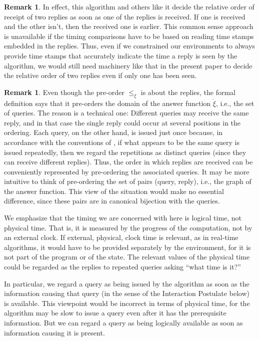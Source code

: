 \documentclass{LMCS}
\theoremstyle{definition}
\newtheorem{rmk}[thm]{Remark}
\newcommand{\ans}{\dot}
\begin{document}
\begin{rmk}
In effect, this algorithm and others like it decide the relative order
of receipt of two replies as soon as one of the replies is received.
If one is received and the other isn't, then the received one is
earlier.  This common sense approach is unavailable if the timing
comparisons have to be based on reading time stamps embedded in the
replies.  Thus, even if we constrained our environments to always
provide time stamps that accurately indicate the time a reply is seen
by the algorithm, we would still need machinery like that in the
present paper to decide the relative order of two replies even if only
one has been seen.
\end{rmk}

\begin{rmk}
  Even though the pre-order $\leq_\xi$ is about the replies, the
  formal definition says that it pre-orders the domain of the answer
  function ${\ans\xi}$, i.e., the set of queries.  The reason is a
  technical one: Different queries may receive the same reply, and in
  that case the single reply could occur at several positions in the
  ordering.  Each query, on the other hand, is issued just once
  because, in accordance with the conventions of \cite{oa1}, if what
  appears to be the same query is issued repeatedly, then we regard
  the repetitions as distinct queries (since they can receive
  different replies).  Thus, the order in which replies are received
  can be conveniently represented by pre-ordering the associated
  queries.  It may be more intuitive to think of pre-ordering the set
  of pairs (query, reply), i.e., the graph of the answer
  function. This view of the situation would make no essential
  difference, since these pairs are in canonical bijection with the
  queries.
\end{rmk}

We emphasize that the timing we are concerned with here is logical
time, not physical time.  That is, it is measured by the progress of
the computation, not by an external clock.  If external, physical,
clock time is relevant, as in real-time algorithms, it would have to
be provided separately by the environment, for it is not part of the
program or of the state.  The relevant values of the physical time
could be regarded as the replies to repeated queries asking ``what
time is it?''

In particular, we regard a query as being issued by the algorithm as
soon as the information causing that query (in the sense of the
Interaction Postulate below) is available.  This viewpoint would be
incorrect in terms of physical time, for the algorithm may be slow to
issue a query even after it has the prerequisite information. But we
can regard a query as being logically available as soon as information
causing it is present.
\end{document}
